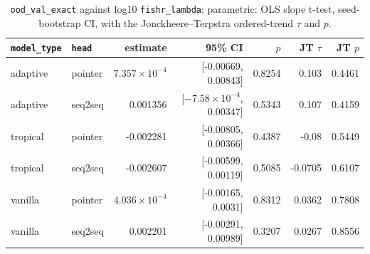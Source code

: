 \documentclass[10pt]{article}
\begin{document}
{\small
\begin{longtable}{llrrrrr}
\caption{\texttt{ood\_val\_exact} against log10 \texttt{fishr\_lambda}: parametric: OLS slope t-test, seed-bootstrap CI, with the Jonckheere--Terpstra ordered-trend $\tau$ and $p$.}\label{tab:trend-ood_val_exact}\\
\toprule
\texttt{model\_type} & \texttt{head} & estimate & 95\% CI & $p$ & JT $\tau$ & JT $p$\\
\midrule
\endhead
adaptive & pointer & $7.357\times10^{-4}$ & [-0.00669, 0.00843] & 0.8254 & 0.103 & 0.4461\\
adaptive & seq2seq & 0.001356 & [$-7.58\times10^{-4}$, 0.00347] & 0.5343 & 0.107 & 0.4159\\
tropical & pointer & -0.002281 & [-0.00805, 0.00366] & 0.4387 & -0.08 & 0.5449\\
tropical & seq2seq & -0.002607 & [-0.00599, 0.00119] & 0.5085 & -0.0705 & 0.6107\\
vanilla & pointer & $4.036\times10^{-4}$ & [-0.00165, 0.0031] & 0.8312 & 0.0362 & 0.7808\\
vanilla & seq2seq & 0.002201 & [-0.00291, 0.00989] & 0.3207 & 0.0267 & 0.8556\\
\bottomrule
\end{longtable}
}
\end{document}
